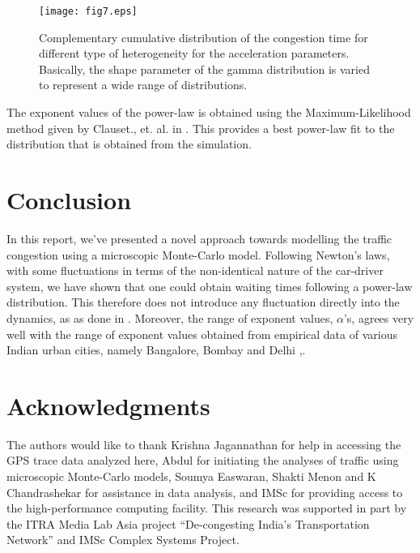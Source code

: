 \documentclass[conference]{IEEEtran}
\begin{document}
\begin{figure}
{    \texttt{[image: fig7.eps]}}
    \caption{Complementary cumulative distribution of the congestion time for different type of heterogeneity for the acceleration parameters. Basically, the shape parameter of the gamma distribution is varied to represent a wide range of distributions.}
    \label{power_law_gam}
\end{figure}

The exponent values of the power-law is obtained using the Maximum-Likelihood method given by Clauset., et. al. in \cite{Clauset2009}. This provides a best power-law fit to the distribution that is obtained from the simulation.


\section{Conclusion}
In this report, we've presented a novel approach towards modelling the traffic congestion using a microscopic Monte-Carlo model. Following Newton's laws, with some fluctuations in terms of the non-identical nature of the car-driver system, we have shown that one could obtain waiting times following a power-law distribution. This therefore does not introduce any fluctuation directly into the dynamics, as as done in \cite{Majith2016}. Moreover, the range of exponent values, $\alpha$'s, agrees very well with the range of exponent values obtained from empirical data of various Indian urban cities, namely Bangalore, Bombay and Delhi \cite{Majith2016},\cite{Majith2015}.


\section*{Acknowledgments}

The authors would like to thank Krishna Jagannathan for help in accessing the GPS trace data analyzed here, Abdul for initiating the analyses of traffic using microscopic Monte-Carlo models, Soumya Easwaran, Shakti Menon and K Chandrashekar for assistance in data analysis, and IMSc for providing access to the high-performance computing facility.
This research was supported in part by the ITRA Media Lab Asia 
project ``De-congesting India's Transportation Network'' and IMSc Complex Systems Project.

\end{document}
